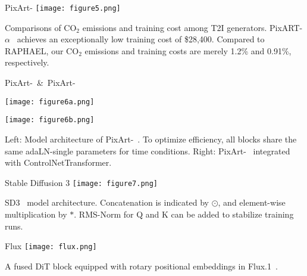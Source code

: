 \begin{refsection}
  \begin{frame}{PixArt-\alpha}
    \centering
    \texttt{[image: figure5.png]}

    {\scriptsize
    Comparisons of CO$_2$ emissions and training cost among T2I generators. PixART-$\alpha$~\parencite{chenPixArtaFastTraining2023} achieves an exceptionally low training cost of \$28,400. Compared to RAPHAEL, our CO$_2$ emissions and training costs are merely 1.2\% and 0.91\%, respectively.
    }
    \bottomleftrefs
  \end{frame}
\end{refsection}

\begin{refsection}
  \begin{frame}{PixArt-\alpha~\&~PixArt-\delta}
    \centering
    \begin{minipage}{0.3\linewidth}
      \centering
      \texttt{[image: figure6a.png]}
    \end{minipage}
    \hfill
    \begin{minipage}{0.35\linewidth}
      \centering
      \texttt{[image: figure6b.png]}
    \end{minipage}

    {\scriptsize
    Left: Model architecture of PixArt-\alpha~\parencite{chenPixArtaFastTraining2023}. To optimize efficiency, all blocks share the same adaLN-single parameters for time conditions. Right: PixArt-\delta~\parencite{chenPIXARTdFastControllable2024} integrated with ControlNetTransformer.      
    }
    \bottomleftrefs
  \end{frame}
\end{refsection}

\begin{refsection}
  \begin{frame}{Stable Diffusion 3}
    \centering
    \texttt{[image: figure7.png]}

    {\scriptsize
    SD3~\parencite{esserScalingRectifiedFlow2024a} model architecture. Concatenation is indicated by $\odot$, and element-wise multiplication by $*$. RMS-Norm for Q and K can be added to stabilize training runs.
    }
    \bottomleftrefs
  \end{frame}
\end{refsection}

\begin{refsection}
  \begin{frame}{Flux}
    \centering
    \texttt{[image: flux.png]}

    {\scriptsize
A fused DiT block equipped with rotary positional embeddings in Flux.1~\parencite{BlackForestLabs2025}.
    }
    \bottomleftrefs
  \end{frame}
\end{refsection}






